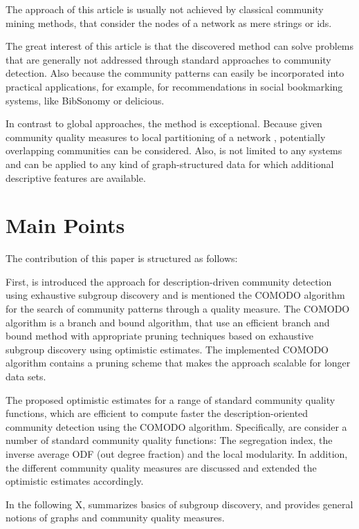 \documentclass[a4paper]{article}
\begin{document}
The approach of this article is usually not achieved by classical community mining methods, that consider the nodes of a network as mere strings or ids.
\vskip 0.3cm

The great interest of this article is that the discovered method can solve problems that are generally not addressed through standard approaches to community detection. Also because the community patterns can easily be incorporated into practical applications, for example, for recommendations in social bookmarking systems, like BibSonomy or delicious.
\vskip 0.3cm

In contrast to global approaches, the method is exceptional. Because given community quality measures to local partitioning of a network , potentially overlapping communities can be considered. Also, is not limited to any systems and can be applied to any kind of graph-structured data for which additional descriptive features are available.

\section{Main Points}
The contribution of this paper is structured as follows:
\vskip 0.3cm

First, is introduced the approach for description-driven community detection using exhaustive subgroup discovery and is mentioned the COMODO algorithm for the search of community patterns through a quality measure. The COMODO algorithm is a branch and bound algorithm, that use an efficient branch and bound method with appropriate pruning techniques based on exhaustive subgroup discovery using optimistic estimates. The implemented COMODO algorithm contains a pruning scheme that makes the approach scalable for longer data sets.
\vskip 0.3cm
	
The proposed optimistic estimates for a range of standard community quality functions, which are efficient to compute faster the description-oriented community detection using the COMODO algorithm. Specifically, are consider a number of standard community quality functions: The segregation index, the inverse average ODF (out degree fraction) and the local modularity. In addition, the different community quality measures are discussed and extended the optimistic estimates accordingly. 
\vskip 0.3cm

In the following X, summarizes basics of subgroup discovery, and provides general notions of graphs and community quality measures. 
\vskip 0.3cm
\end{document}
